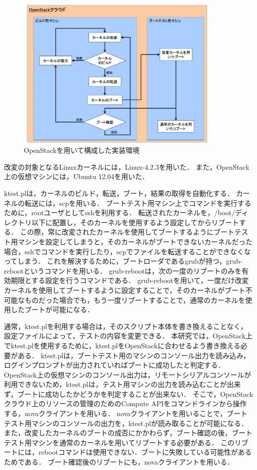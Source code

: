 \documentclass[graduation-thesis]{mlarticle}
\begin{document}
\begin{figure}[H]
  \begin{center}
    \includegraphics[width=10.0cm]{images/openstackenv.png}
    \caption{OpenStackを用いて構成した実装環境}
    \label{fig:openstackenv}
  \end{center}
\end{figure}

改変の対象となるLinuxカーネルには，Linux-4.2.3を用いた．
また，OpenStack上の仮想マシンには，Ubuntu 12.04を用いた．

ktest.plは，カーネルのビルド，転送，ブート，結果の取得を自動化する．
カーネルの転送には，scpを用いる．
ブートテスト用マシン上でコマンドを実行するために，rootユーザとしてsshを利用する．
転送されたカーネルを，/boot/ディレクトリ以下に配置し，そのカーネルを使用するよう設定してからリブートする．
この際，常に改変されたカーネルを使用してブートするようにブートテスト用マシンを設定してしまうと，そのカーネルがブートできないカーネルだった場合，sshでコマンドを実行したり，scpでファイルを転送することができなくなってしまう．
これを解決するために，ブートローダであるgrubが持つ，grub-rebootというコマンドを用いる．
grub-rebootは，次の一度のリブートのみを有効期限とする設定を行うコマンドである．
grub-rebootを用いて，一度だけ改変カーネルを使用してブートするように設定することで，そのカーネルがブート不可能なものだった場合でも，もう一度リブートすることで，通常のカーネルを使用したブートが可能になる．

通常，ktest.plを利用する場合は，そのスクリプト本体を書き換えることなく，設定ファイルによって，テストの内容を変更できる．
本研究では，OpenStack上でktest.plを使用するために，ktest.plをOpenStackに合わせるよう書き換える必要がある．
ktest.plは，ブートテスト用のマシンのコンソール出力を読み込み，ログインプロンプトが出力されていればブートに成功したと判定する．
OpenStack上の仮想マシンのコンソール出力は，リモートシリアルコンソールが利用できないため，ktest.plは，テスト用マシンの出力を読み込むことが出来ず，ブートに成功したかどうかを判定することが出来ない．
そこで，OpenStackクラウド上のリソースの管理のためのCompute APIをコマンドラインから操作する，novaクライアントを用いる．
novaクライアントを用いることで，ブートテスト用マシンのコンソールの出力を，ktest.plが読み取ることが可能になる．
また，改変したカーネルのブートの成否にかかわらず，ブート確認の後，ブートテスト用マシンを通常のカーネルを用いてリブートする必要がある．
このリブートには，rebootコマンドは使用できない．ブートに失敗している可能性があるためである．
ブート確認後のリブートにも，novaクライアントを用いる．
\end{document}
